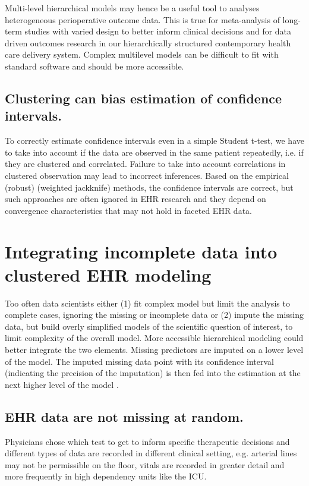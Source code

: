 \documentclass[11pt,notitlepage]{article}
\begin{document}
Multi-level hierarchical models may hence be a useful tool to analyses heterogeneous perioperative outcome data. This is true for meta-analysis of long-term studies with varied design to better inform clinical decisions\cite{AndreaeJohnsonAbstract2013,Spiegelhalter2004bayesian} and for data driven outcomes research  in our hierarchically structured contemporary health care delivery system. Complex multilevel models can be difficult to fit with standard software and should be more accessible.

\subsection*{Clustering can bias estimation of confidence intervals.} To correctly estimate confidence intervals even in a simple Student t-test, we have to take into account if the data are observed in the same patient repeatedly, i.e. if they are clustered and correlated. Failure to take into account correlations in clustered observation may lead to incorrect inferences. Based on the empirical (robust) (weighted jackknife) methods, the confidence intervals are correct, but such approaches are often ignored in EHR research and they depend on convergence characteristics that may not hold in faceted EHR data. 

\section*{Integrating incomplete data into clustered EHR modeling}

Too often data scientists either (1) fit complex model but limit the analysis to complete cases, ignoring the missing or incomplete data or (2) impute the missing data, but build overly simplified models of the scientific question of interest, to limit complexity of the overall model. More accessible hierarchical modeling could better integrate the two elements. Missing predictors are imputed on a lower level of the model. The imputed missing data point with its confidence interval (indicating the precision of the imputation) is then fed into the estimation at the next higher level of the model \cite{Gelman2001imputation}. 

\subsection*{EHR data are not missing at random.} Physicians chose which test to get to inform specific therapeutic decisions and different types of data are recorded in different clinical setting, e.g. arterial lines may not be permissible on the floor, vitals are recorded in greater detail and more frequently in high dependency units like the ICU. 
\end{document}
